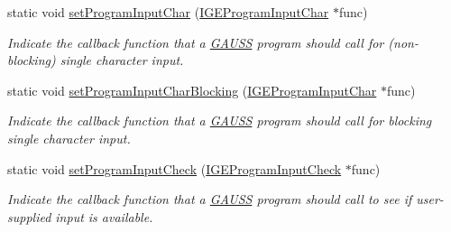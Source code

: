 \begin{DoxyCompactItemize}
static void \hyperlink{class_g_a_u_s_s_a71a60afb143ae00b18d6fe3fd99f316d}{set\+Program\+Input\+Char} (\hyperlink{class_i_g_e_program_input_char}{I\+G\+E\+Program\+Input\+Char} $\ast$func)
\begin{DoxyCompactList}\small\item\em Indicate the callback function that a \hyperlink{class_g_a_u_s_s}{G\+A\+U\+SS} program should call for (non-\/blocking) single character input. \end{DoxyCompactList}\item 
static void \hyperlink{class_g_a_u_s_s_a300d6e33dbfd2a45f56ff2769f585435}{set\+Program\+Input\+Char\+Blocking} (\hyperlink{class_i_g_e_program_input_char}{I\+G\+E\+Program\+Input\+Char} $\ast$func)
\begin{DoxyCompactList}\small\item\em Indicate the callback function that a \hyperlink{class_g_a_u_s_s}{G\+A\+U\+SS} program should call for blocking single character input. \end{DoxyCompactList}\item 
static void \hyperlink{class_g_a_u_s_s_a6517b404cf71d157808a1cb73e3c0ddb}{set\+Program\+Input\+Check} (\hyperlink{class_i_g_e_program_input_check}{I\+G\+E\+Program\+Input\+Check} $\ast$func)
\begin{DoxyCompactList}\small\item\em Indicate the callback function that a \hyperlink{class_g_a_u_s_s}{G\+A\+U\+SS} program should call to see if user-\/supplied input is available. \end{DoxyCompactList}\end{DoxyCompactItemize}
